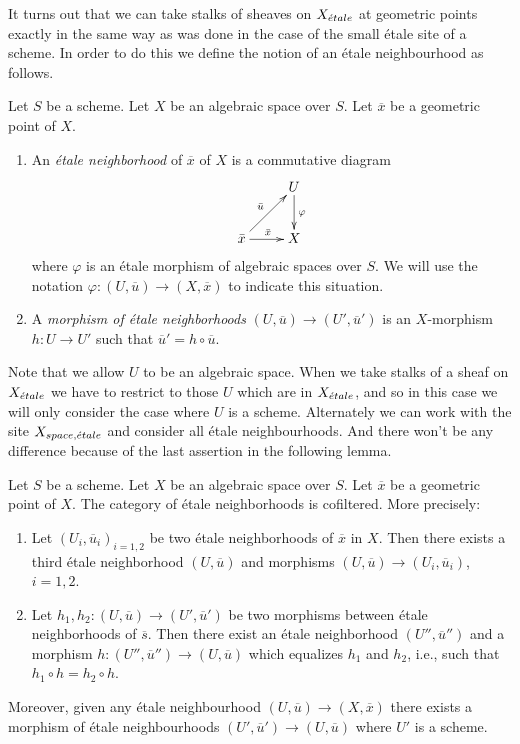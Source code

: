 \noindent
It turns out that we can take stalks of sheaves on $X_{\acute{e}tale}$
at geometric points exactly in the same way as was done in the
case of the small \'etale site of a scheme. In order to do this we
define the notion of an \'etale neighbourhood as follows.

\begin{definition}
\label{definition-etale-neighbourhood}
Let $S$ be a scheme. Let $X$ be an algebraic space over $S$.
Let $\overline{x}$ be a geometric point of $X$.
\begin{enumerate}
\item An {\it \'etale neighborhood} of $\overline{x}$
of $X$ is a commutative diagram
$$
\xymatrix{
& U \ar[d]^\varphi \\
{\bar x} \ar[r]^{\bar x} \ar[ur]^{\bar u} & X
}
$$
where $\varphi$ is an \'etale morphism of algebraic spaces over $S$.
We will use the notation $\varphi : (U, \overline{u}) \to (X, \overline{x})$
to indicate this situation.
\item A {\it morphism of \'etale neighborhoods}
$(U, \overline{u}) \to (U', \overline{u}')$
is an $X$-morphism $h : U \to U'$
such that $\overline{u}' = h \circ \overline{u}$.
\end{enumerate}
\end{definition}

\noindent
Note that we allow $U$ to be an algebraic space. When we take stalks
of a sheaf on $X_{\acute{e}tale}$ we have to restrict to those $U$ which
are in $X_{\acute{e}tale}$, and so in this case we will only consider the case
where $U$ is a scheme. Alternately we can work with the site
$X_{space, {\acute{e}tale}}$ and consider all \'etale neighbourhoods. And there
won't be any difference because of the last assertion in the following lemma.

\begin{lemma}
\label{lemma-cofinal-etale}
Let $S$ be a scheme. Let $X$ be an algebraic space over $S$.
Let $\overline{x}$ be a geometric point of $X$.
The category of \'etale neighborhoods is cofiltered. More precisely:
\begin{enumerate}
\item Let $(U_i, \overline{u}_i)_{i = 1, 2}$ be two \'etale neighborhoods of
$\overline{x}$ in $X$. Then there exists a third \'etale neighborhood
$(U, \overline{u})$ and morphisms
$(U, \overline{u}) \to (U_i, \overline{u}_i)$, $i = 1, 2$.
\item Let $h_1, h_2: (U, \overline{u}) \to (U', \overline{u}')$ be two
morphisms between \'etale neighborhoods of $\overline{s}$. Then there exist an
\'etale neighborhood $(U'', \overline{u}'')$ and a morphism
$h : (U'', \overline{u}'') \to (U, \overline{u})$
which equalizes $h_1$ and $h_2$, i.e., such that
$h_1 \circ h = h_2 \circ h$.
\end{enumerate}
Moreover, given any \'etale neighbourhood
$(U, \overline{u}) \to (X, \overline{x})$
there exists a morphism of \'etale neighbourhoods
$(U', \overline{u}') \to (U, \overline{u})$
where $U'$ is a scheme.
\end{lemma}

